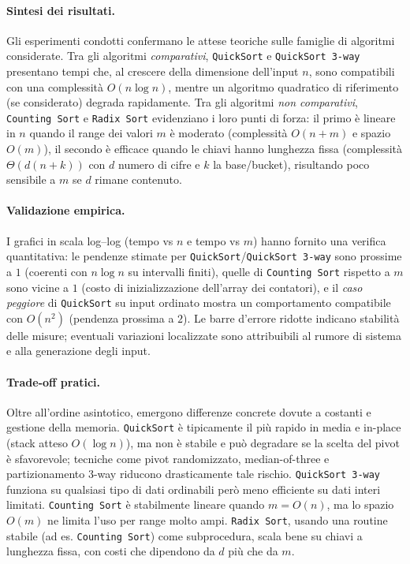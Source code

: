 \documentclass[a4paper, 11pt]{article}
\begin{document}
\paragraph{Sintesi dei risultati.}
Gli esperimenti condotti confermano le attese teoriche sulle famiglie di algoritmi considerate. 
Tra gli algoritmi \emph{comparativi}, \texttt{QuickSort} e \texttt{QuickSort 3-way} presentano tempi che, al crescere della dimensione dell'input \(n\), sono compatibili con una complessità \(O(n\log n)\), mentre un algoritmo quadratico di riferimento (se considerato) degrada rapidamente. 
Tra gli algoritmi \emph{non comparativi}, \texttt{Counting Sort} e \texttt{Radix Sort} evidenziano i loro punti di forza: il primo è lineare in \(n\) quando il range dei valori \(m\) è moderato (complessità \(O(n+m)\) e spazio \(O(m)\)), il secondo è efficace quando le chiavi hanno lunghezza fissa (complessità \(\Theta(d(n+k))\) con \(d\) numero di cifre e \(k\) la base/bucket), risultando poco sensibile a \(m\) se \(d\) rimane contenuto.

\paragraph{Validazione empirica.}
I grafici in scala log--log (tempo vs \(n\) e tempo vs \(m\)) hanno fornito una verifica quantitativa: 
le pendenze stimate per \texttt{QuickSort}/\texttt{QuickSort 3-way} sono prossime a \(1\) (coerenti con \(n\log n\) su intervalli finiti), 
quelle di \texttt{Counting Sort} rispetto a \(m\) sono vicine a \(1\) (costo di inizializzazione dell'array dei contatori), 
e il \emph{caso peggiore} di \texttt{QuickSort} su input ordinato mostra un comportamento compatibile con \(O(n^2)\) (pendenza prossima a \(2\)). 
Le barre d'errore ridotte indicano stabilità delle misure; eventuali variazioni localizzate sono attribuibili al rumore di sistema e alla generazione degli input.

\paragraph{Trade-off pratici.}
Oltre all'ordine asintotico, emergono differenze concrete dovute a costanti e gestione della memoria. 
\texttt{QuickSort} è tipicamente il più rapido in media e in-place (stack atteso \(O(\log n)\)), ma non è stabile e può degradare se la scelta del pivot è sfavorevole; tecniche come pivot randomizzato, median-of-three e partizionamento 3-way riducono drasticamente tale rischio. 
\texttt{QuickSort 3-way} funziona su qualsiasi tipo di dati ordinabili però meno efficiente su dati interi limitati. 
\texttt{Counting Sort} è stabilmente lineare quando \(m=O(n)\), ma lo spazio \(O(m)\) ne limita l'uso per range molto ampi. 
\texttt{Radix Sort}, usando una routine stabile (ad es. \texttt{Counting Sort}) come subprocedura, scala bene su chiavi a lunghezza fissa, con costi che dipendono da \(d\) più che da \(m\).
\end{document}

